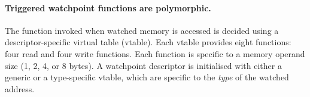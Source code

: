 \documentclass[letterpaper,twocolumn,10pt]{article}
\begin{document}



\paragraph{Triggered watchpoint functions are polymorphic.} The function invoked when watched memory is accessed is decided using a descriptor-specific virtual table (vtable). Each vtable provides eight functions: four read and four write functions. Each function is specific to a memory operand size (1, 2, 4, or 8 bytes). A watchpoint descriptor is initialised with either a generic or a type-specific vtable, which are specific to the \emph{type} of the watched address. %


\end{document}
